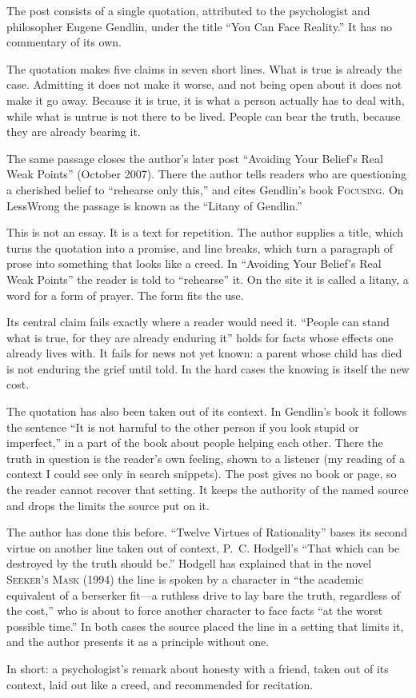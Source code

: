 \begin{afterword}
\summaryhead

The post consists of a single quotation, attributed to the psychologist and philosopher Eugene Gendlin, under the title ``You Can Face Reality.'' It has no commentary of its own.

The quotation makes five claims in seven short lines. What is true is already the case. Admitting it does not make it worse, and not being open about it does not make it go away. Because it is true, it is what a person actually has to deal with, while what is untrue is not there to be lived. People can bear the truth, because they are already bearing it.

The same passage closes the author's later post ``Avoiding Your Belief's Real Weak Points'' (October 2007). There the author tells readers who are questioning a cherished belief to ``rehearse only this,'' and cites Gendlin's book \textsc{Focusing}. On LessWrong the passage is known as the ``Litany of Gendlin.''

\responsehead

This is not an essay. It is a text for repetition. The author supplies a title, which turns the quotation into a promise, and line breaks, which turn a paragraph of prose into something that looks like a creed. In ``Avoiding Your Belief's Real Weak Points'' the reader is told to ``rehearse'' it. On the site it is called a litany, a word for a form of prayer. The form fits the use.

Its central claim fails exactly where a reader would need it. ``People can stand what is true, for they are already enduring it'' holds for facts whose effects one already lives with. It fails for news not yet known: a parent whose child has died is not enduring the grief until told. In the hard cases the knowing is itself the new cost.

The quotation has also been taken out of its context. In Gendlin's book it follows the sentence ``It is not harmful to the other person if you look stupid or imperfect,'' in a part of the book about people helping each other. There the truth in question is the reader's own feeling, shown to a listener (my reading of a context I could see only in search snippets). The post gives no book or page, so the reader cannot recover that setting. It keeps the authority of the named source and drops the limits the source put on it.

The author has done this before. ``Twelve Virtues of Rationality'' bases its second virtue on another line taken out of context, P.~C. Hodgell's ``That which can be destroyed by the truth should be.'' Hodgell has explained that in the novel \textsc{Seeker's Mask} (1994) the line is spoken by a character in ``the academic equivalent of a berserker fit---a ruthless drive to lay bare the truth, regardless of the cost,'' who is about to force another character to face facts ``at the worst possible time.'' In both cases the source placed the line in a setting that limits it, and the author presents it as a principle without one.

In short: a psychologist's remark about honesty with a friend, taken out of its context, laid out like a creed, and recommended for recitation.
\end{afterword}
